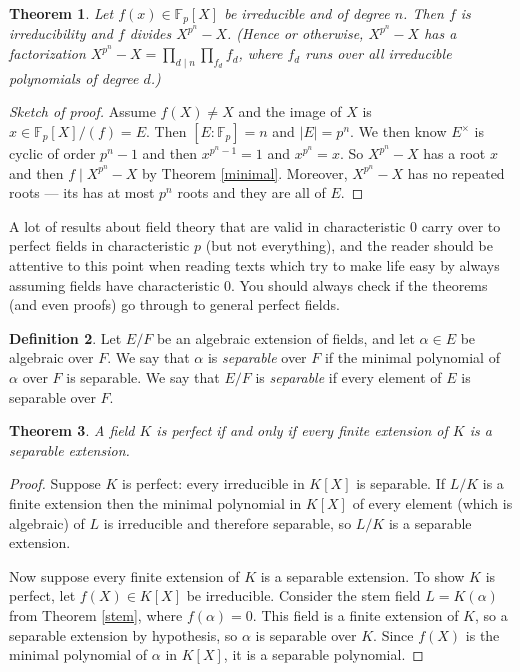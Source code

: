 \documentclass[12pt]{report}
\newtheorem{thm}{Theorem}[section]
\theoremstyle{definition}
\newtheorem{defn}[thm]{Definition}
\def\FF{\mathbb{F}}
\def\aa{\alpha}
\begin{document}
\begin{thm}
    Let $f(x)\in \FF_p[X]$ be irreducible and of degree $n$. Then $f$ is irreducibility and $f$ divides $X^{p^n}-X$. (Hence or otherwise, $X^{p^n} -X$ has a factorization $X^{p^n}-X =  \prod_{d\mid n}\prod_{f_d} f_d$, where $f_d$ runs over all irreducible polynomials of degree $d$.)
\end{thm}

\begin{proof}[Sketch of proof]
    Assume $f(X)\not= X$ and the image of $X$ is $x\in \FF_p[X]/(f) = E$. Then $[E:\FF_p] =  n$ and $|E|=p^n$. We then know $E^\times$ is cyclic of order $p^n-1$ and then $x^{p^n-1} = 1$ and $x^{p^n} = x$. So $X^{p^n}-X$ has a root $x$ and then $f\mid X^{p^n}-X$ by Theorem \ref{minimal}. Moreover, $X^{p^n}-X$ has no repeated roots --- its has at most $p^n$ roots and they are all of $E$.
\end{proof}


A lot of results about field theory that are valid in characteristic 0 carry over to perfect fields in characteristic $p$ (but not everything), and the reader should be attentive to this point when reading texts which try to make life easy by always assuming fields have characteristic 0. You should always check if the theorems (and even proofs) go through to general perfect fields. 

\begin{defn}
    Let $E/F$ be an algebraic extension of fields, and let $\aa \in E$ be algebraic over $F$. We say that $\aa$ is \emph{separable} over $F$ if the minimal polynomial of $\aa$ over $F$ is separable. We say that $E/F$ is \emph{separable} if every element of $E$ is separable over $F$.
\end{defn}


\begin{thm}
    A field $K$ is perfect if and only if every finite extension of $K$ is a separable extension.
\end{thm}

\begin{proof}
    Suppose $K$ is perfect: every irreducible in $K[X]$ is separable. If $L/K$ is a finite extension then the minimal polynomial in $K[X]$ of every element (which is algebraic) of $L$ is irreducible and therefore separable, so $L/K$ is a separable extension.

    Now suppose every finite extension of $K$ is a separable extension. To show $K$ is perfect, let $f(X) \in K[X]$ be irreducible. Consider the stem field $L = K(\aa)$ from Theorem \ref{stem}, where $f(\aa) = 0$. This field is a finite extension of $K$, so a separable extension by hypothesis, so $\aa$ is separable over $K$. Since $f(X)$ is the minimal polynomial of $\aa$ in $K[X]$, it is a separable polynomial.
\end{proof}
\end{document}
